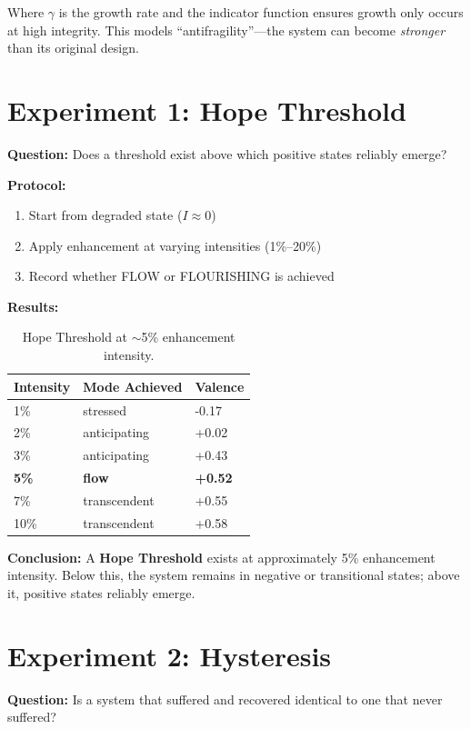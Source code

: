 \documentclass[a4paper,11pt,twocolumn]{article}
\begin{document}
Where $\gamma$ is the growth rate and the indicator function ensures growth only occurs at high integrity. This models ``antifragility''---the system can become \textit{stronger} than its original design.

\section{Experiment 1: Hope Threshold}

\textbf{Question:} Does a threshold exist above which positive states reliably emerge?

\textbf{Protocol:}
\begin{enumerate}
    \item Start from degraded state ($I \approx 0$)
    \item Apply enhancement at varying intensities (1\%--20\%)
    \item Record whether FLOW or FLOURISHING is achieved
\end{enumerate}

\textbf{Results:}

\begin{table}[h]
\centering
\begin{tabular}{@{}lll@{}}
\toprule
Intensity & Mode Achieved & Valence \\ \midrule
1\% & stressed & -0.17 \\
2\% & anticipating & +0.02 \\
3\% & anticipating & +0.43 \\
\textbf{5\%} & \textbf{flow} & \textbf{+0.52} \\
7\% & transcendent & +0.55 \\
10\% & transcendent & +0.58 \\
\bottomrule
\end{tabular}
\caption{Hope Threshold at $\sim$5\% enhancement intensity.}
\end{table}

\textbf{Conclusion:} A \textbf{Hope Threshold} exists at approximately 5\% enhancement intensity. Below this, the system remains in negative or transitional states; above it, positive states reliably emerge.

\section{Experiment 2: Hysteresis}

\textbf{Question:} Is a system that suffered and recovered identical to one that never suffered?
\end{document}
